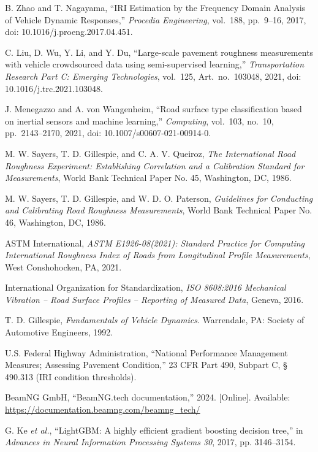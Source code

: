 B. Zhao and T. Nagayama, ``IRI Estimation by the Frequency Domain Analysis of Vehicle Dynamic Responses,'' \emph{Procedia Engineering}, vol.~188, pp.~9--16, 2017, doi: 10.1016/j.proeng.2017.04.451.

C. Liu, D. Wu, Y. Li, and Y. Du, ``Large-scale pavement roughness measurements with vehicle crowdsourced data using semi-supervised learning,'' \emph{Transportation Research Part C: Emerging Technologies}, vol.~125, Art.~no.~103048, 2021, doi: 10.1016/j.trc.2021.103048.

J. Menegazzo and A. von Wangenheim, ``Road surface type classification based on inertial sensors and machine learning,'' \emph{Computing}, vol.~103, no.~10, pp.~2143--2170, 2021, doi: 10.1007/s00607-021-00914-0.

M. W. Sayers, T. D. Gillespie, and C. A. V. Queiroz, \emph{The International Road Roughness Experiment: Establishing Correlation and a Calibration Standard for Measurements}, World Bank Technical Paper No. 45, Washington, DC, 1986.

M. W. Sayers, T. D. Gillespie, and W. D. O. Paterson, \emph{Guidelines for Conducting and Calibrating Road Roughness Measurements}, World Bank Technical Paper No. 46, Washington, DC, 1986.

ASTM International, \emph{ASTM E1926-08(2021): Standard Practice for Computing International Roughness Index of Roads from Longitudinal Profile Measurements}, West Conshohocken, PA, 2021.

International Organization for Standardization, \emph{ISO 8608:2016 Mechanical Vibration -- Road Surface Profiles -- Reporting of Measured Data}, Geneva, 2016.

T. D. Gillespie, \emph{Fundamentals of Vehicle Dynamics}. Warrendale, PA: Society of Automotive Engineers, 1992.

U.S. Federal Highway Administration, ``National Performance Management Measures; Assessing Pavement Condition,'' 23 CFR Part 490, Subpart C, \S\,490.313 (IRI condition thresholds).

BeamNG GmbH, ``BeamNG.tech documentation,'' 2024. [Online]. Available: \url{https://documentation.beamng.com/beamng_tech/}

G. Ke \emph{et al.}, ``LightGBM: A highly efficient gradient boosting decision tree,'' in \emph{Advances in Neural Information Processing Systems 30}, 2017, pp. 3146--3154.

